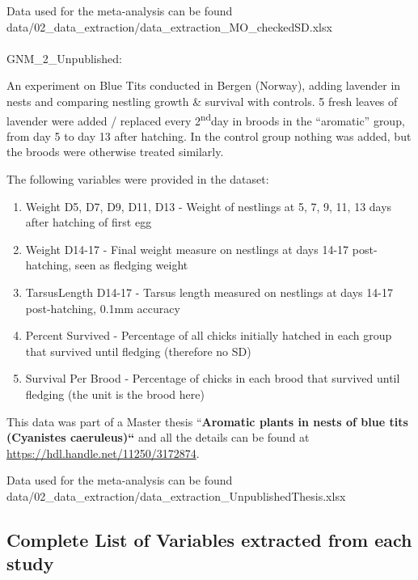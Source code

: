\documentclass[
  number,
  review,
  onecolumn]{elsarticle}
\makeatletter
\let\oldparagraph\paragraph
\renewcommand{\paragraph}{
    \@ifstar
      \xxxParagraphStar
      \xxxParagraphNoStar
  }
\newcommand{\xxxParagraphStar}[1]{\oldparagraph*{#1}\mbox{}}
\newcommand{\xxxParagraphNoStar}[1]{\oldparagraph{#1}\mbox{}}
\providecommand{\tightlist}{%
  \setlength{\itemsep}{0pt}\setlength{\parskip}{0pt}}
\makeatother
\begin{document}
Data used for the meta-analysis can be found
data/02\_data\_extraction/data\_extraction\_MO\_checkedSD.xlsx\\

\paragraph{GNM\_2\_Unpublished:}\label{gnm_2_unpublished}

An experiment on Blue Tits conducted in Bergen (Norway), adding lavender
in nests and comparing nestling growth \& survival with controls. 5
fresh leaves of lavender were added / replaced every
2\textsuperscript{nd}day in broods in the ``aromatic'' group, from day 5
to day 13 after hatching. In the control group nothing was added, but
the broods were otherwise treated similarly.

The following variables were provided in the dataset:

\begin{enumerate}
\def\labelenumi{\arabic{enumi}.}
\tightlist
\item
  Weight D5, D7, D9, D11, D13 - Weight of nestlings at 5, 7, 9, 11, 13
  days after hatching of first egg
\item
  Weight D14-17 - Final weight measure on nestlings at days 14-17
  post-hatching, seen as fledging weight
\item
  TarsusLength D14-17 - Tarsus length measured on nestlings at days
  14-17 post-hatching, 0.1mm accuracy
\item
  Percent Survived - Percentage of all chicks initially hatched in each
  group that survived until fledging (therefore no SD)
\item
  Survival Per Brood - Percentage of chicks in each brood that survived
  until fledging (the unit is the brood here)
\end{enumerate}

This data was part of a Master thesis ``\textbf{Aromatic plants in nests
of blue tits (Cyanistes caeruleus)``} and all the details can be found
at \url{https://hdl.handle.net/11250/3172874}.

Data used for the meta-analysis can be found
data/02\_data\_extraction/data\_extraction\_UnpublishedThesis.xlsx\\

\subsection{Complete List of Variables extracted from each
study}\label{complete-list-of-variables-extracted-from-each-study}
\end{document}
